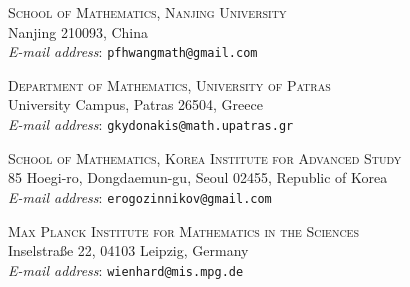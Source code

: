 \documentclass[oneside,11pt]{amsart}
\theoremstyle{definition}
\theoremstyle{remark}
\numberwithin{thm}{section}
\numberwithin{equation}{section}
\begin{document}
\bigskip

\noindent\small{\textsc{School of Mathematics, Nanjing University}\\
		 Nanjing 210093, China}\\
\emph{E-mail address}:  \texttt{pfhwangmath@gmail.com}

\medskip

\noindent\small{\textsc{Department of Mathematics, University of Patras}\\
  University Campus, Patras 26504, Greece}\\
\emph{E-mail address}:  \texttt{gkydonakis@math.upatras.gr}

\medskip

\noindent\small{\textsc{School of Mathematics, Korea Institute for Advanced Study}\\
  85 Hoegi-ro, Dongdaemun-gu, Seoul 02455, Republic of Korea}\\
\emph{E-mail address}:  \texttt{erogozinnikov@gmail.com}

\medskip



\noindent\small{\textsc{Max Planck Institute for Mathematics in the Sciences}\\
  Inselstraße 22, 04103 Leipzig, Germany}\\
\emph{E-mail address}:  \texttt{wienhard@mis.mpg.de}

    
\bigskip
	
	
\end{document}
